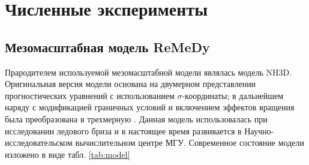 %
%

\setcounter{chapter}{2}
\chapter{Численные эксперименты}
\label{ch:experiments}
\section{Мезомасштабная модель ReMeDy}
Прародителем используемой мезомасштабной модели являлась модель NH3D. Оригинальная версия модели \citep{MillerWhite1984,XueThorpe1991} основана на двумерном представлении прогностических уравнений с использованием $\sigma$-координаты; в дальнейшем наряду с модификацией граничных условий и включением эффектов вращения была преобразована в трехмерную \citep{MirandaPhD}. Данная модель использовалась при исследовании ледового бриза \citep{ChechinEtAl2013} и в настоящее время развивается в Научно-исследовательском вычислительном центре МГУ. Современное состояние модели изложено в виде табл. \ref{tab:model}

